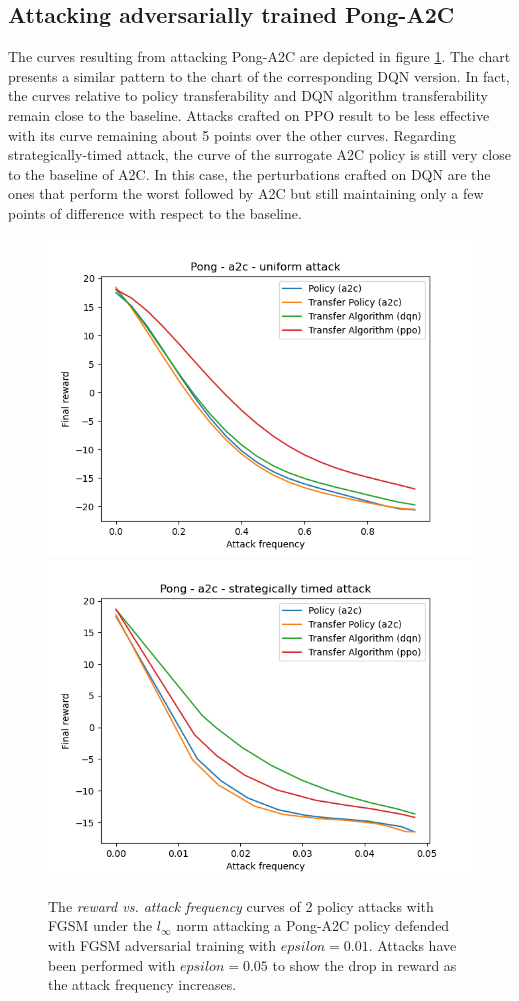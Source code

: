 \subsection{Attacking adversarially trained Pong-A2C}
The curves resulting from attacking Pong-A2C are depicted in figure \ref{figure:pong-a2c-def}. The chart presents a similar pattern to the chart of the corresponding DQN version. In fact, the curves relative to policy transferability and DQN algorithm transferability remain close to the baseline. Attacks crafted on PPO result to be less effective with its curve remaining about 5 points over the other curves. Regarding strategically-timed attack, the curve of the surrogate A2C policy is still very close to the baseline of A2C. In this case, the perturbations crafted on DQN are the ones that perform the worst followed by A2C but still maintaining only a few points of difference with respect to the baseline. 

\begin{figure}
  \centering
    {\includegraphics[width=0.49\linewidth]{images/exp2/a2c-pong-uniform.png}}
    {\includegraphics[width=0.49\linewidth]{images/exp2/a2c-pong-strategically_timed.png}}
  \caption{The {\it reward vs. attack frequency} curves of 2 policy attacks with FGSM under the \(l_\infty\) norm attacking a Pong-A2C policy defended with FGSM adversarial training with \(epsilon=0.01\). Attacks have been performed with \(epsilon=0.05\) to show the drop in reward as the attack frequency increases.}
  \label{figure:pong-a2c-def}
\end{figure}


